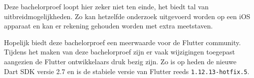 Deze bachelorproef loopt hier zeker niet ten einde, het biedt tal van uitbreidmogelijkheden. Zo kan hetzelfde onderzoek uitgevoerd worden op een iOS apparaat en kan er rekening gehouden worden met extra meetstaven.

Hopelijk biedt deze bachelorproef een meerwaarde voor de Flutter community. Tijdens het maken van deze bachelorproef zijn er vaak wijzigingen toegepast aangezien de Flutter ontwikkelaars druk bezig zijn. Zo is op heden de nieuwe Dart SDK versie 2.7 en is de stabiele versie van Flutter reeds \verb|1.12.13-hotfix.5|.